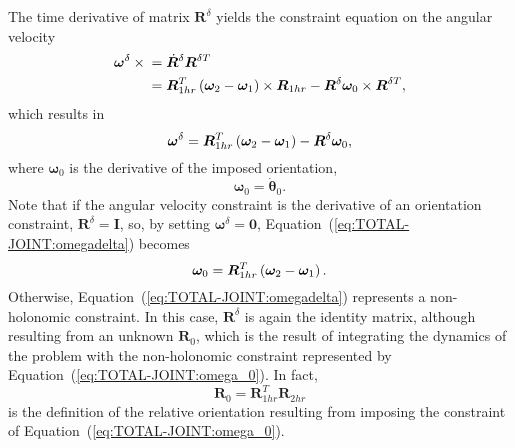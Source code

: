 \documentclass[10pt,dvips,fleqn,subeqn]{report}
\newcommand{\T}[1]{\bm{#1}}
\begin{document}
The time derivative of matrix $\T{R}^{\delta}$ yields
the constraint equation on the angular velocity
\begin{align}
	\T{\omega}^{\delta}\times{}
	&= \dot{\T{R}}^{\delta} \T{R}^{\delta T} \nonumber \\
	&= \T{R}_{1hr}^T \plbr{
		\T{\omega}_2 - \T{\omega}_1
	} \times \T{R}_{1hr}
	- \T{R}^{\delta} \T{\omega}_0 \times \T{R}^{\delta T},
\end{align}
which results in
\begin{equation}
	\T{\omega}^{\delta} = \T{R}_{1hr}^T \plbr{
		\T{\omega}_2 - \T{\omega}_1
	} - \T{R}^{\delta} \T{\omega}_0 ,
	\label{eq:TOTAL-JOINT:omegadelta}
\end{equation}
where $\T{\omega}_0$ is the derivative of the imposed orientation,
\begin{equation}
	\T{\omega}_0 = \dot{\T{\theta}}_0 .
\end{equation}
Note that if the angular velocity constraint 
is the derivative of an orientation constraint, $\T{R}^{\delta}=\T{I}$,
so, by setting $\T{\omega}^{\delta}=\T{0}$,
Equation~(\ref{eq:TOTAL-JOINT:omegadelta}) becomes
\begin{equation}
	\T{\omega}_0 = \T{R}_{1hr}^T \plbr{
		\T{\omega}_2 - \T{\omega}_1
	} .
	\label{eq:TOTAL-JOINT:omega_0}
\end{equation}
Otherwise, Equation~(\ref{eq:TOTAL-JOINT:omegadelta}) represents
a non-holonomic constraint.
In this case, $\T{R}^{\delta}$ is again the identity matrix, although
resulting from an unknown $\T{R}_0$, which is the result of integrating
the dynamics of the problem with the non-holonomic constraint represented
by Equation~(\ref{eq:TOTAL-JOINT:omega_0}).
In fact,
\begin{equation}
	\T{R}_0 = \T{R}_{1hr}^T \T{R}_{2hr}
\end{equation}
is the definition of the relative orientation resulting from 
imposing the constraint of Equation~(\ref{eq:TOTAL-JOINT:omega_0}).
\end{document}
